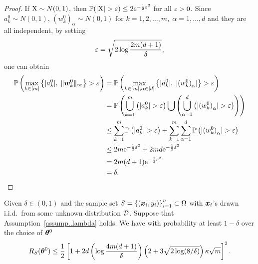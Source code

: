 \documentclass{article}
\begin{document}
\begin{proof}
    If $\textnormal{X} \sim N(0, 1)$, then $\mathbb{P}(\lvert\textnormal{X}\rvert > \varepsilon) \leq 2\mathrm{e}^{-\frac{1}{2}\varepsilon^2}$ for all $\varepsilon > 0$. Since $a^0_k\sim N(0,1)$, ${(w_k^0)}_{\alpha}\sim N(0,1)$ for $k=1, 2, \ldots, m,\; \alpha =1,\ldots,d$ and they are all independent, by setting
    \begin{equation*}
        \varepsilon = \sqrt{2\log\frac{2m(d+1)}{\delta}},
    \end{equation*}
    one can obtain
    \begin{equation*}
        \begin{aligned}
            \mathbb{P}\left(\max\limits_{k\in[m]}\left\{\lvert a_k^0\rvert,\; \lVert\bm{w}_k^0\rVert_{\infty}\right \}>\varepsilon\right)
             & = \mathbb{P}\left(\max\limits_{k\in[m],\alpha\in[d]}\left\{\lvert a_k^0\rvert,\; \lvert{(w^0_k)}_{\alpha}\rvert\right \}>\varepsilon\right)                                            \\
             & = \mathbb{P}\left(\bigcup\limits_{k=1}^m\left(\lvert a_k^0\rvert>\varepsilon\right)\bigcup\left(\bigcup\limits_{\alpha=1}^d\left(\lvert{(w_k^0)}_{\alpha}\rvert>\varepsilon\right)\right)\right) \\
             & \leq \sum_{k=1}^m \mathbb{P}\left(\lvert a_k^0\rvert>\varepsilon\right) + \sum_{k=1}^m\sum_{\alpha=1}^d \mathbb{P}\left(\lvert{(w^0_k)}_{\alpha}\rvert>\varepsilon\right)                          \\
             & \leq 2m \mathrm{e}^{-\frac{1}{2}\varepsilon^2} + 2md \mathrm{e}^{-\frac{1}{2}\varepsilon^2}                                                                                                 \\
             & = 2m(d+1)\mathrm{e}^{-\frac{1}{2}\varepsilon^2}                                                                                                                              \\
             & = \delta.
        \end{aligned}
    \end{equation*}
\end{proof}
\begin{lem}
    Given $\delta\in(0,1)$ and the sample set $S = {\{(\bm{x}_i, y_i)\}}_{i=1}^n\subset\Omega$ with $\bm{x}_i$'s drawn i.i.d.\ from some unknown distribution $\mathcal{D}$. Suppose that Assumption~\ref{assump..lambda} holds. We have with probability at least $1-\delta$ over the choice of $\bm{\theta}^0$
    \begin{equation}
        R_S(\bm{\theta}^0)\leq\frac{1}{2}\left[1 + 2d\left(\log\frac{4m(d+1)}{\delta}\right)\left(2+3\sqrt{2\log(8/\delta)}\right)\kappa\sqrt{m}\right]^2.
    \end{equation}
\end{lem}
\end{document}
